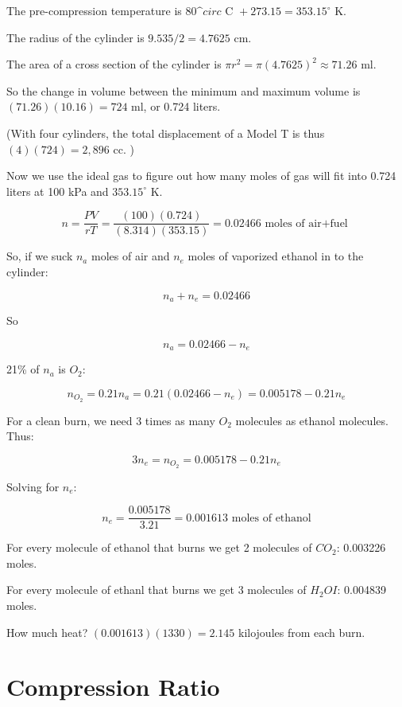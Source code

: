 \begin{Answer}[ref=fuelmix] 

The pre-compression temperature is $80\^circ \text{ C } + 273.15 = 353.15^\circ$ K.

The radius of the cylinder is $9.535/2 =4.7625$ cm.

The area of a cross section of the cylinder is $\pi r^2 = \pi (4.7625)^2 \approx 71.26$ ml.

So the change in volume between the minimum and maximum volume is $ (71.26)(10.16) = 724$ ml, or 0.724 liters.

(With four cylinders,  the total displacement of a Model T is thus $ (4)(724) = 2,896$ cc. )

Now we use the ideal gas to figure out how many moles of gas will fit into 0.724 liters at 100 kPa and $353.15^\circ$ K.

$$n = \frac{PV}{rT} = \frac{(100)(0.724)}{(8.314)(353.15)} = 0.02466 \text{ moles of air+fuel }$$ 

So,  if we suck $n_a$ moles of air and $n_e$ moles of vaporized ethanol in to the cylinder:

$$n_a + n_e = 0.02466$$

So

$$n_a = 0.02466 -  n_e$$

21\% of $n_a$ is $O_2$:

$$n_{O_2} = 0.21 n_a = 0.21 (0.02466 -  n_e) = 0.005178 - 0.21 n_e$$

For a clean burn,  we need 3 times as many $O_2$ molecules as ethanol molecules.  Thus:

$$3 n_e  =   n_{O_2} = 0.005178 - 0.21 n_e$$

Solving for $n_e$:

$$n_e = \frac{0.005178}{3.21}  = 0.001613 \text{ moles  of ethanol}$$

For every molecule of ethanol that burns we get 2 molecules of $CO_2$: 0.003226 moles.

For every molecule of ethanl that burns we get 3 molecules of $H_2OI$: 0.004839 moles.

How much heat?  $(0.001613)(1330) =  2.145$ kilojoules from each burn.

\end{Answer}

\section{Compression Ratio}


